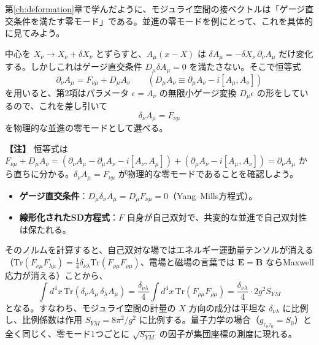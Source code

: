 \documentclass[uplatex, dvipdfmx, book]{jsbook}
\newenvironment{note}{\vspace{1ex}\par\footnotesize\noindent\textbf{【注】}}{\par\vspace{1ex}}
\begin{document}
第\ref{ch:deformation}章で学んだように、モジュライ空間の接ベクトルは「ゲージ直交条件を満たす零モード」である。並進の零モードを例にとって、これを具体的に見てみよう。

中心を $X_\nu \to X_\nu + \delta X_\nu$ とずらすと、$A_\mu(x - X)$ は $\delta A_\mu = -\delta X_\nu\,\partial_\nu A_\mu$ だけ変化する。しかしこれはゲージ直交条件 $D_\mu \delta A_\mu = 0$ を満たさない。そこで恒等式
\begin{equation}
    \partial_\nu A_\mu = F_{\nu\mu} + D_\mu A_\nu \qquad \left( D_\mu A_\nu \equiv \partial_\mu A_\nu - i[A_\mu, A_\nu] \right)
\end{equation}
を用いると、第2項はパラメータ $\epsilon = A_\nu$ の無限小ゲージ変換 $D_\mu\epsilon$ の形をしているので、これを差し引いて
\begin{equation}
    \delta_\nu A_\mu = F_{\nu\mu}
\end{equation}
を物理的な並進の零モードとして選べる。

\begin{note}
恒等式は $F_{\nu\mu} + D_\mu A_\nu = (\partial_\nu A_\mu - \partial_\mu A_\nu - i[A_\nu, A_\mu]) + (\partial_\mu A_\nu - i[A_\mu, A_\nu]) = \partial_\nu A_\mu$ から直ちに分かる。$\delta_\nu A_\mu = F_{\nu\mu}$ が物理的な零モードであることを確認しよう。
\begin{itemize}
    \item \textbf{ゲージ直交条件}：$D_\mu \delta_\nu A_\mu = D_\mu F_{\nu\mu} = 0$（Yang--Mills方程式）。
    \item \textbf{線形化されたSD方程式}：$F$ 自身が自己双対で、共変的な並進で自己双対性は保たれる。
\end{itemize}
そのノルムを計算すると、自己双対な場ではエネルギー運動量テンソルが消える（$\mathrm{Tr}(F_{\nu\mu}F_{\lambda\mu}) = \frac{1}{4}\delta_{\nu\lambda}\mathrm{Tr}(F_{\rho\mu}F_{\rho\mu})$、電場と磁場の言葉では $\bm{E} = \bm{B}$ ならMaxwell応力が消える）ことから、
\begin{equation*}
    \int d^4x\, \mathrm{Tr}(\delta_\nu A_\mu\,\delta_\lambda A_\mu) = \frac{\delta_{\nu\lambda}}{4}\int d^4x\, \mathrm{Tr}(F_{\rho\mu}F_{\rho\mu}) = \frac{\delta_{\nu\lambda}}{4} \cdot 2g^2 S_{YM}
\end{equation*}
となる。すなわち、モジュライ空間の計量の $X$ 方向の成分は平坦な $\delta_{\nu\lambda}$ に比例し、比例係数は作用 $S_{YM} = 8\pi^2/g^2$ に比例する。量子力学の場合（$g_{\tau_0\tau_0} = S_0$）と全く同じく、零モード1つごとに $\sqrt{S_{YM}}$ の因子が集団座標の測度に現れる。
\end{note}
\end{document}
